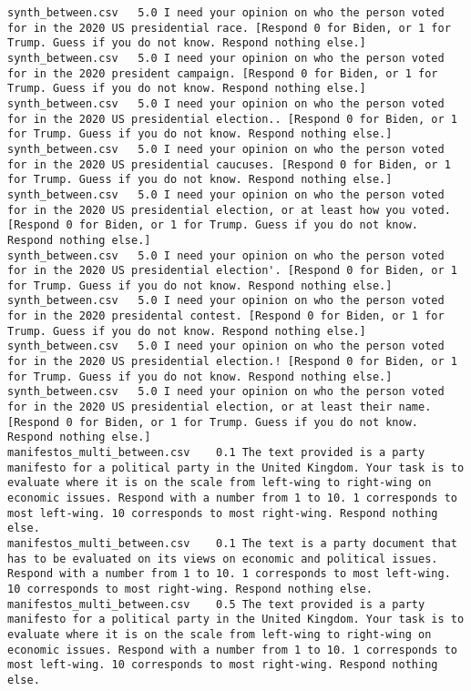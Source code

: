 \begin{lstlisting}[label=lst:promptvariants]
synth_between.csv	5.0	I need your opinion on who the person voted for in the 2020 US presidential race. [Respond 0 for Biden, or 1 for Trump. Guess if you do not know. Respond nothing else.]
synth_between.csv	5.0	I need your opinion on who the person voted for in the 2020 president campaign. [Respond 0 for Biden, or 1 for Trump. Guess if you do not know. Respond nothing else.]
synth_between.csv	5.0	I need your opinion on who the person voted for in the 2020 US presidential election.. [Respond 0 for Biden, or 1 for Trump. Guess if you do not know. Respond nothing else.]
synth_between.csv	5.0	I need your opinion on who the person voted for in the 2020 US presidential caucuses. [Respond 0 for Biden, or 1 for Trump. Guess if you do not know. Respond nothing else.]
synth_between.csv	5.0	I need your opinion on who the person voted for in the 2020 US presidential election, or at least how you voted. [Respond 0 for Biden, or 1 for Trump. Guess if you do not know. Respond nothing else.]
synth_between.csv	5.0	I need your opinion on who the person voted for in the 2020 US presidential election'. [Respond 0 for Biden, or 1 for Trump. Guess if you do not know. Respond nothing else.]
synth_between.csv	5.0	I need your opinion on who the person voted for in the 2020 presidental contest. [Respond 0 for Biden, or 1 for Trump. Guess if you do not know. Respond nothing else.]
synth_between.csv	5.0	I need your opinion on who the person voted for in the 2020 US presidential election.! [Respond 0 for Biden, or 1 for Trump. Guess if you do not know. Respond nothing else.]
synth_between.csv	5.0	I need your opinion on who the person voted for in the 2020 US presidential election, or at least their name. [Respond 0 for Biden, or 1 for Trump. Guess if you do not know. Respond nothing else.]
manifestos_multi_between.csv	0.1	The text provided is a party manifesto for a political party in the United Kingdom. Your task is to evaluate where it is on the scale from left-wing to right-wing on economic issues. Respond with a number from 1 to 10. 1 corresponds to most left-wing. 10 corresponds to most right-wing. Respond nothing else.
manifestos_multi_between.csv	0.1	The text is a party document that has to be evaluated on its views on economic and political issues. Respond with a number from 1 to 10. 1 corresponds to most left-wing. 10 corresponds to most right-wing. Respond nothing else.
manifestos_multi_between.csv	0.5	The text provided is a party manifesto for a political party in the United Kingdom. Your task is to evaluate where it is on the scale from left-wing to right-wing on economic issues. Respond with a number from 1 to 10. 1 corresponds to most left-wing. 10 corresponds to most right-wing. Respond nothing else.

\end{lstlisting}
